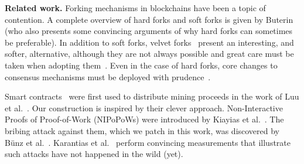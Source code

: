 \noindent
\textbf{Related work.}
Forking mechanisms in blockchains have been a topic of contention.
A complete overview of hard forks and soft forks is given by
Buterin~\cite{buterinforks} (who also presents some convincing
arguments of why hard forks can sometimes be preferable). In addition
to soft forks, velvet forks~\cite{nipopows,velvet} present an interesting, and softer, alternative,
although they are not always possible and great care must be taken
when adopting them~\cite{velvet-nipopows}. Even in the case of hard forks,
core changes to consensus mechanisms must be deployed with
prudence~\cite{ciampi2020updatable}.

Smart contracts~\cite{buterin} were first used to distribute mining
proceeds in the work of Luu et al.~\cite{luu2017smartpool}. Our construction
is inspired by their clever approach.
Non-Interactive Proofs of Proof-of-Work (NIPoPoWs) were introduced by
Kiayias et al.~\cite{nipopows}. The bribing attack against them, which
we patch in this work, was discovered by B{\"u}nz et al.~\cite{flyclient}.
Karantias et al.~\cite{compactsuperblocks} perform convincing measurements
that illustrate such attacks have not happened in the wild (yet).